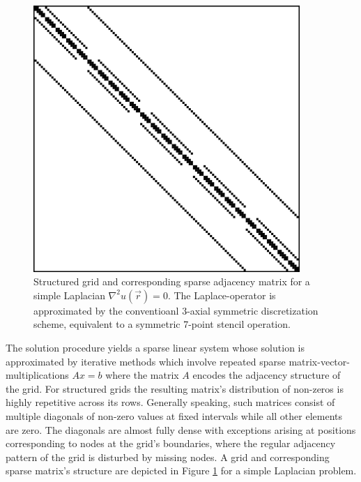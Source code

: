 \documentclass{article}
\begin{document}
    \begin{figure}
        \centering
        \begin{minipage}{0.45\textwidth}
          \centering
          
        \end{minipage}
        \begin{minipage}{0.35\textwidth}
            \centering
            \includegraphics[width=0.9\textwidth]{fig/laplacian_example.png} %
        \end{minipage}
        \caption{Structured grid and corresponding sparse adjacency matrix for a simple Laplacian $\nabla^2 u(\vec{r}) = 0$. The Laplace-operator is approximated by the conventioanl 3-axial symmetric discretization scheme,       equivalent to a symmetric 7-point stencil operation.}
        \label{fig:laplacian_example}
    \end{figure}

    The solution procedure yields a sparse linear system whose solution is approximated by iterative methods which involve repeated sparse matrix-vector-multiplications $Ax = b$ where the matrix $A$ encodes the adjacency structure of the grid. For structured grids the resulting matrix's distribution of non-zeros is highly repetitive across its rows. Generally speaking, such matrices consist of multiple diagonals of non-zero values at fixed intervals while all other elements are zero. The diagonals are almost fully dense with exceptions arising at positions corresponding to nodes at the grid's boundaries, where the regular adjacency pattern of the grid is disturbed by missing nodes. A grid and corresponding sparse matrix's structure are depicted in Figure \ref{fig:laplacian_example} for a simple Laplacian problem.
\end{document}
